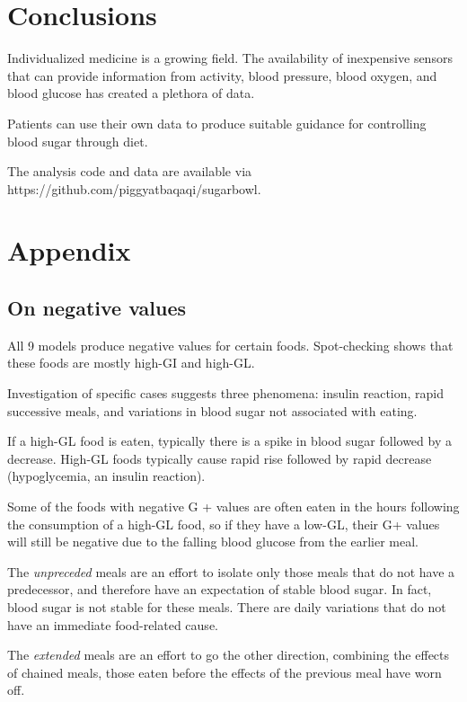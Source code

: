 \documentclass[conference]{IEEEtran}
\begin{document}
\section{Conclusions}

Individualized medicine is a growing field. The availability of inexpensive sensors that can provide information from activity, blood pressure, blood oxygen, and blood glucose has created a plethora of data.

Patients can use their own data to produce suitable guidance for controlling blood sugar through diet.

The analysis code and data are available via https://github.com/piggyatbaqaqi/sugarbowl.

\section*{Appendix}

\subsection{On negative values}

All 9 models produce negative values for certain foods. Spot-checking shows that these foods are mostly high-GI and high-GL.

Investigation of specific cases suggests three phenomena: insulin reaction, rapid successive meals, and variations in blood sugar not associated with eating.

If a high-GL food is eaten, typically there is a spike in blood sugar followed by a decrease. High-GL foods typically cause rapid rise followed by rapid decrease (hypoglycemia, an insulin reaction).

Some of the foods with negative G + values are often eaten in the hours following the consumption of a high-GL food, so if they have a low-GL, their G+ values will still be negative due to the falling blood glucose from the earlier meal.

The \emph{unpreceded} meals are an effort to isolate only those meals that do not have a predecessor, and therefore have an expectation of stable blood sugar. In fact, blood sugar is not stable for these meals. There are daily variations that do not have an immediate food-related cause.

The \emph{extended} meals are an effort to go the other direction, combining the effects of chained meals, those eaten before the effects of the previous meal have worn off.
\end{document}

